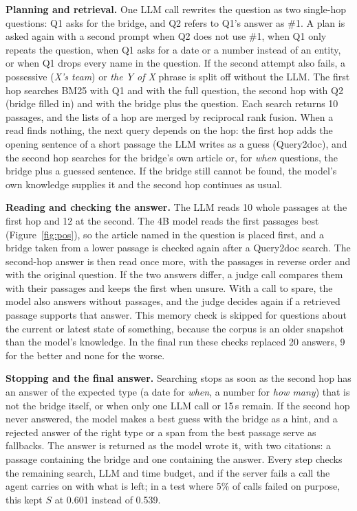 \documentclass[10pt,a4paper]{article}
\begin{document}
\textbf{Planning and retrieval.} One LLM call rewrites the question as two single-hop questions: Q1 asks for the
bridge, and Q2 refers to Q1's answer as \#1. A plan is asked again with a second prompt when Q2 does not use \#1,
when Q1 only repeats the question, when Q1 asks for a date or a number instead of an entity, or when Q1 drops every
name in the question. If the second attempt also fails, a possessive (\emph{X's team}) or \emph{the Y of X} phrase is
split off without the LLM. The first hop searches BM25 with Q1 and with the full question, the second hop with Q2
(bridge filled in) and with the bridge plus the question. Each search returns 10 passages, and the lists of a hop are
merged by reciprocal rank fusion. When a read finds nothing, the next query depends on the hop: the first hop adds
the opening sentence of a short passage the LLM writes as a guess (Query2doc), and the second hop searches for the
bridge's own article or, for \emph{when} questions, the bridge plus a guessed sentence. If the bridge still cannot
be found, the model's own knowledge supplies it and the second hop continues as usual.

\textbf{Reading and checking the answer.} The LLM reads 10 whole passages at the first hop and 12 at the second.
The 4B model reads the first passages best (Figure~\ref{fig:pos}), so the article named in the question is placed
first, and a bridge taken from a lower passage is checked again after a Query2doc search. The second-hop answer is
then read once more, with the passages in reverse order and with the original question. If the two answers differ,
a judge call compares them with their passages and keeps the first when unsure. With a call to spare, the model also
answers without passages, and the judge decides again if a retrieved passage supports that answer. This memory check
is skipped for questions about the current or latest state of something, because the corpus is an older snapshot
than the model's knowledge. In the final run these checks replaced 20 answers, 9 for the better and none for the worse.

\textbf{Stopping and the final answer.} Searching stops as soon as the second hop has an answer of the expected type
(a date for \emph{when}, a number for \emph{how many}) that is not the bridge itself, or when only one LLM call or
15\,s remain. If the second hop never answered, the model makes a best guess with the bridge as a hint, and a
rejected answer of the right type or a span from the best passage serve as fallbacks. The answer is returned as the
model wrote it, with two citations: a passage containing the bridge and one containing the answer. Every step checks
the remaining search, LLM and time budget, and if the server fails a call the agent carries on with what is left; in
a test where 5\% of calls failed on purpose, this kept $S$ at 0.601 instead of 0.539.
\end{document}
